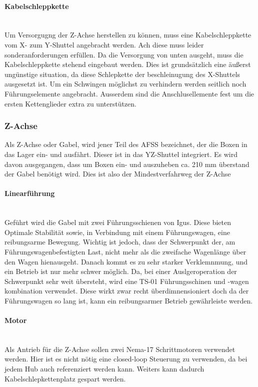 \paragraph{Kabelschleppkette}\mbox{}\\
Um Versorgugng der Z-Achse herstellen zu können, muss eine Kabelschleppkette vom X- zum Y-Shuttel angebracht werden. Ach diese muss leider sonderanforderungen erfüllen. Da die Versorgung von unten ausgeht, muss die Kabelschleppkette stehend eingebaut werden. Dies ist grundsätzlich eine äußerst ungünstige situation, da diese Schlepkette der beschleinugung des X-Shuttels ausgesetzt ist. Um ein Schwingen möglichst zu verhindern werden seitlich noch Führungselemente angebracht. Ausserdem sind die Anschlusellemente fest um die ersten Kettenglieder extra zu unterstützen. \cite{igus_vertikal}

\subsubsection{Z-Achse}
Als Z-Achse oder Gabel, wird jener Teil des AFSS bezeichnet, der die Boxen in das Lager ein- und ausfährt. Dieser ist in das YZ-Shuttel integriert. Es wird davon ausgegangen, dass um Boxen ein- und auszuheben ca. 210 mm überstand der Gabel benötigt wird. Dies ist also der Mindestverfahrweg der Z-Achse

\paragraph{Linearführung}\mbox{}\\
Geführt wird die Gabel mit zwei Führungsschienen von Igus. Diese bieten Optimale Stabilität sowie, in Verbindung mit einem Führungswagen, eine reibungsarme Bewegung. Wichtig ist jedoch, dass der Schwerpunkt der, am Führungswagenbefestigten Last, nicht mehr als die zweifache Wagenlänge über den Wagen hienausgeht. Danach kommt es zu sehr starker Verklemnmung, und ein Betrieb ist nur mehr schwer möglich. Da, bei einer Auslgeroperation der Schwerpunkt sehr weit übersteht, wird eine TS-01 Führungsschinen und -wagen kombination verwendet. Diese wirkt zwar recht überdimnensioniert doch da der Führungswagen so lang ist, kann ein reibungsarmer Betrieb gewährleiste werden. 

\paragraph{Motor}\mbox{}\\
Als Antrieb für die Z-Achse sollen zwei Nema-17 Schrittmotoren verwendet werden. Hier ist es nicht nötig eine closed-loop Steuerung zu verwenden, da bei jedem Hub auch referenziert werden kann. Weiters kann dadurch Kabelschlepkettenplatz gespart werden. 


